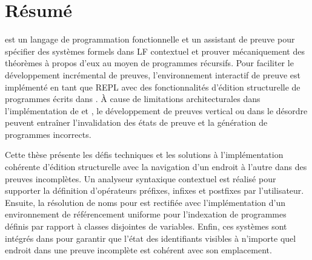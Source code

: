 
\chapter*{Résumé}

\Beluga est un langage de programmation fonctionnelle et un assistant de preuve pour spécifier des systèmes formels dans \acs{LF} contextuel et prouver mécaniquement des théorèmes à propos d'eux au moyen de programmes récursifs.
Pour faciliter le développement incrémental de preuves, l'environnement interactif de preuve \Harpoon est implémenté en tant que \acs{REPL} avec des fonctionnalités d'édition structurelle de programmes écrits dans \Beluga.
À cause de limitations architecturales dans l'implémentation de \Beluga et \Harpoon, le développement de preuves vertical ou dans le désordre peuvent entraîner l'invalidation des états de preuve et la génération de programmes incorrects.

Cette thèse présente les défis techniques et les solutions à l'implémentation cohérente d'édition structurelle avec la navigation d'un endroit à l'autre dans des preuves incomplètes.
Un analyseur syntaxique contextuel est réalisé pour supporter la définition d'opérateurs préfixes, infixes et postfixes par l'utilisateur.
Ensuite, la résolution de noms pour \Beluga est rectifiée avec l'implémentation d'un environnement de référencement uniforme pour l'indexation de programmes définis par rapport à classes disjointes de variables.
Enfin, ces systèmes sont intégrés dans \Harpoon pour garantir que l'état des identifiants visibles à n'importe quel endroit dans une preuve incomplète est cohérent avec son emplacement.

